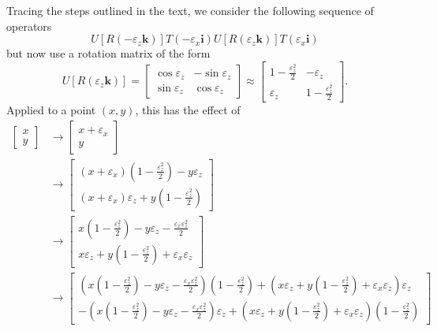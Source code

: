 \documentclass[../principles-of-quantum-mechanics.tex]{subfiles}
\begin{document}
\begin{questions}
	\begin{solution}
		Tracing the steps outlined in the text, we consider the following sequence of operators
		$$U[R(-\varepsilon_z\mathbf{k})]T(-\varepsilon_x\mathbf{i})U[R(\varepsilon_z\mathbf{k})]T(\varepsilon_x\mathbf{i})$$
		but now use a rotation matrix of the form
		$$U[R(\varepsilon_z\mathbf{k})] = \begin{bmatrix}
			\cos\varepsilon_z & -\sin\varepsilon_z \\ 
			\sin\varepsilon_z & \cos\varepsilon_z
		\end{bmatrix} \approx \begin{bmatrix}
		1 - \frac{\varepsilon_z^2}{2} & -\varepsilon_z \\
		\varepsilon_z & 1 - \frac{\varepsilon_z^2}{2}
	\end{bmatrix}.$$
		Applied to a point $(x, y)$, this has the effect of
		\begin{align*}
			\begin{bmatrix}x \\ y\end{bmatrix} &\to \begin{bmatrix}x + \varepsilon_x \\ y\end{bmatrix} \\
			&\to \begin{bmatrix}(x + \varepsilon_x)(1 - \frac{\varepsilon_z^2}{2}) - y\varepsilon_z \\ (x + \varepsilon_x)\varepsilon_z + y(1 - \frac{\varepsilon_z^2}{2})\end{bmatrix} \\
			&\to \begin{bmatrix}
					x(1 - \frac{\varepsilon_z^2}{2}) - y\varepsilon_z - \frac{\varepsilon_x\varepsilon_z^2}{2} \\
					x\varepsilon_z + y(1 - \frac{\varepsilon_z^2}{2}) + \varepsilon_x\varepsilon_z
				\end{bmatrix} \\
			&\to \begin{bmatrix}
				(x(1 - \frac{\varepsilon_z^2}{2}) - y\varepsilon_z - \frac{\varepsilon_x\varepsilon_z^2}{2})(1 - \frac{\varepsilon_z^2}{2}) + (x\varepsilon_z + y(1 - \frac{\varepsilon_z^2}{2}) + \varepsilon_x\varepsilon_z)\varepsilon_z \\
				-(x(1 - \frac{\varepsilon_z^2}{2}) - y\varepsilon_z - \frac{\varepsilon_x\varepsilon_z^2}{2})\varepsilon_z + (x\varepsilon_z + y(1 - \frac{\varepsilon_z^2}{2}) + \varepsilon_x\varepsilon_z)(1 - \frac{\varepsilon_z^2}{2})

\end{bmatrix}
\end{align*}
\end{solution}
\end{questions}
\end{document}
